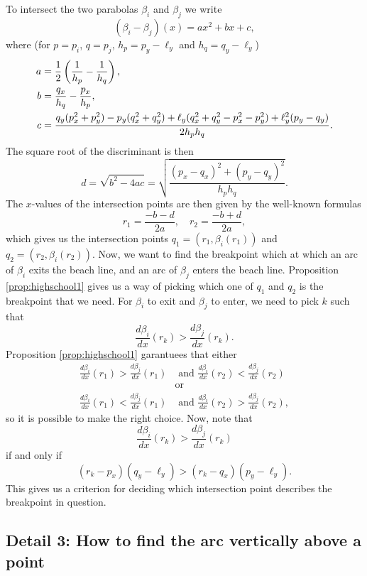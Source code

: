To intersect the two parabolas $\beta_i$ and $\beta_j$ we write
\[
    (\beta_i - \beta_j)(x) = a x^2 + b x + c,
\]
where (for $p = p_i$, $q = p_j$, $h_p = p_y - \ell_y$ and $h_q = q_y - \ell_y$)
\begin{align*}
    a &= \frac{1}{2} \left(\frac{1}{h_p} - \frac{1}{h_q}\right), \\
    b &= \frac{q_x}{h_q} - \frac{p_x}{h_p}, \\
    c &= \frac{q_y(p_x^2 + p_y^2) - p_y (q_x^2 + q_y^2) + \ell_y (q_x^2 + q_y^2 - p_x^2 - p_y^2) + \ell_y^2 (p_y - q_y)}{2 h_p h_q}.
\end{align*}
The square root of the discriminant is then
\[
    d = \sqrt{b^2 - 4 ac} = \sqrt{\frac{(p_x - q_x)^2 + (p_y - q_y)^2}{h_p h_q}}.
\]
The $x$-values of the intersection points are then given by the well-known formulas
\[
    r_1 = \frac{-b - d}{2 a}, \quad
    r_2 = \frac{-b + d}{2 a},
\]
which gives us the intersection points $q_1 = (r_1, \beta_i(r_1))$ and $q_2 = (r_2, \beta_i(r_2))$. Now, we want to find the breakpoint which at which an arc of $\beta_i$ exits the beach line, and an arc of $\beta_j$ enters the beach line. Proposition \ref{prop:highschool1} gives us a way of picking which one of $q_1$ and $q_2$ is the breakpoint that we need. For $\beta_i$ to exit and $\beta_j$ to enter, we need to pick $k$ such that
\[
    \frac{d \beta_i}{dx}(r_k) > \frac{d \beta_j}{dx}(r_k).
\]
 Proposition \ref{prop:highschool1} garantuees that either
\begin{align*}
    \frac{d \beta_i}{dx}(r_1) > \frac{d \beta_j}{dx}(r_1) &\text{ and } \frac{d \beta_i}{dx}(r_2) < \frac{d \beta_j}{dx}(r_2) \\
    &\text{or} \\
    \frac{d \beta_i}{dx}(r_1) < \frac{d \beta_j}{dx}(r_1) &\text{ and } \frac{d \beta_i}{dx}(r_2) > \frac{d \beta_j}{dx}(r_2),
\end{align*}
so it is possible to make the right choice. Now, note that
\[
    \frac{d \beta_i}{dx}(r_k) > \frac{d \beta_j}{dx}(r_k)
\]
if and only if
\[
    (r_k - p_x) (q_y - \ell_y) > (r_k - q_x) (p_y - \ell_y).
\]
This gives us a criterion for deciding which intersection point describes the breakpoint in question.

\subsection*{Detail 3: How to find the arc vertically above a point}
